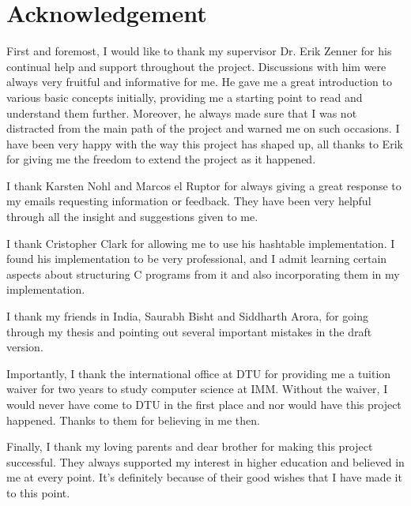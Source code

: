 
\chapter*{Acknowledgement}

First and foremost, I would like to thank my supervisor Dr. Erik Zenner for his continual help and support throughout the project. Discussions with him were always very fruitful and informative for me. He gave me a great introduction to various basic concepts initially, providing me a starting point to read and understand them further. Moreover, he always made sure that I was not distracted from the main path of the project and warned me on such occasions. I have been very happy with the way this project has shaped up, all thanks to Erik for giving me the freedom to extend the project as it happened. 

I thank Karsten Nohl and Marcos el Ruptor for always giving a great response to my emails requesting information or feedback. They have been very helpful through all the insight and suggestions given to me. 

I thank Cristopher Clark for allowing me to use his hashtable implementation. I found his implementation to be very professional, and I admit learning certain aspects about structuring C programs from it and also incorporating them in my implementation. 

I thank my friends in India, Saurabh Bisht and Siddharth Arora, for going through my thesis and pointing out several important mistakes in the draft version.

Importantly, I thank the international office at DTU for providing me a tuition waiver for two years to study computer science at IMM. Without the waiver, I would never have come to DTU in the first place and nor would have this project happened. Thanks to them for believing in me then.

Finally, I thank my loving parents and dear brother for making this project successful. They always supported my interest in higher education and believed in me at every point. It's definitely because of their good wishes that I have made it to this point. 